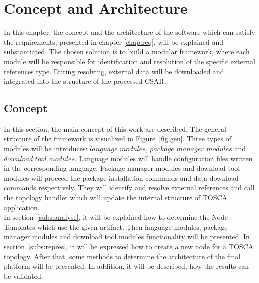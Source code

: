 
\chapter{Concept and Architecture}\label{chap:conarch}
In this chapter, the concept and the architecture of the software which can satisfy the requirements, presented in chapter \ref{chap:req}, will be explained and substantiated.
The chosen solution is to build a modular framework, where each module will be responsible for identification and resolution of the specific external references type.
During resolving, external data will be downloaded and integrated into the structure of the processed CSAR.
\section{Concept}
In this section, the main concept of this work are described.
The general structure of the framework is visualized in Figure~\ref{fig:gen}. 
Three types of modules will be introduces: $language$ $modules$, $package$ $manager$ $modules$ and $download$ $tool$ $modules$.
Language modules will handle configuration files written in the corresponding language.
Package manager modules and download tool modules will proceed the package installation commands and data download commands respectively.
They will identify and resolve external references and call the topology handler which will update the internal structure of TOSCA application. \\
In section~\ref{subs:analyse}, it will be explained how to determine the Node Templates which use the given artifact.
Then language modules, package manager modules and download tool modules functionality will be presented.
In section~\ref{subs:repres}, it will be expressed how to create a new node for a TOSCA topology. 
After that, some methods to determine the architecture of the final platform will be presented.
In addition, it will be described, how the results can be validated.


